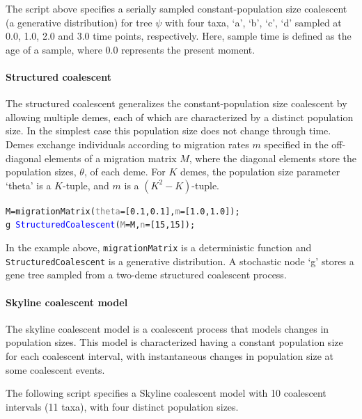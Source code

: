 \documentclass[10pt,letterpaper,table]{article}
\theoremstyle{definition}
\begin{document}
The script above specifies a serially sampled constant-population size coalescent (a generative distribution) for tree $\psi$ with four taxa, `a', `b', `c', `d' sampled at 0.0, 1.0, 2.0 and 3.0 time points, respectively. 
Here, sample time is defined as the age of a sample, where 0.0 represents the present moment.

\paragraph{Structured coalescent}
The structured coalescent \cite{hudson1990oxford, notohara1990coalescent} generalizes the constant-population size coalescent \cite{kingman82} by allowing multiple demes, each of which are characterized by a distinct population size. 
In the simplest case this population size does not change through time.
Demes exchange individuals according to migration rates $m$ specified in the off-diagonal elements of a migration matrix $M$, where the diagonal elements store the population sizes, $\theta$, of each deme.
For $K$ demes, the population size parameter `theta' is a $K$-tuple, and $m$ is a $(K^2-K)$-tuple.

{\small
  \begin{alltt}
    M = \textcolor{generator}{migrationMatrix}(\textcolor{gray}{theta}=[\textcolor{constant}{0.1}, \textcolor{constant}{0.1}], \textcolor{gray}{m}=[\textcolor{constant}{1.0}, \textcolor{constant}{1.0}]);
    \textcolor{bluishgreen}{g} ~ \textcolor{blue}{StructuredCoalescent}(\textcolor{gray}{M}=M, \textcolor{gray}{n}=[\textcolor{constant}{15}, \textcolor{constant}{15}]);
  \end{alltt}
}

In the example above, \texttt{migrationMatrix} is a deterministic function and \texttt{StructuredCoalescent} is a generative distribution. 
A stochastic node `g' stores a gene tree sampled from a two-deme structured coalescent process.

\paragraph{Skyline coalescent model}
The skyline coalescent model \cite{drummond2005bayesian} is a coalescent process that models changes in population sizes.
This model is characterized having a constant population size for each coalescent interval, with instantaneous changes in population size at some coalescent events.

The following script specifies a Skyline coalescent model with 10 coalescent intervals (11 taxa), with four distinct population sizes.
\end{document}
